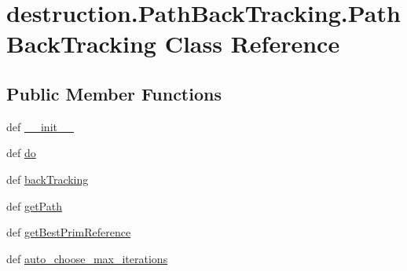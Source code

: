 \hypertarget{classdestruction_1_1_path_back_tracking_1_1_path_back_tracking}{\section{destruction.\-Path\-Back\-Tracking.\-Path\-Back\-Tracking Class Reference}
\label{classdestruction_1_1_path_back_tracking_1_1_path_back_tracking}
}
\subsection*{Public Member Functions}
\begin{DoxyCompactItemize}
\item 
def \hyperlink{classdestruction_1_1_path_back_tracking_1_1_path_back_tracking_a6a529e0fdc65f04fba9c32e741b23523}{\-\_\-\-\_\-init\-\_\-\-\_\-}
\item 
def \hyperlink{classdestruction_1_1_path_back_tracking_1_1_path_back_tracking_a6fe4107ce07cfa378456a085ae2a81dc}{do}
\item 
def \hyperlink{classdestruction_1_1_path_back_tracking_1_1_path_back_tracking_a51b6044cd5c61cda41767c221132fa18}{back\-Tracking}
\item 
def \hyperlink{classdestruction_1_1_path_back_tracking_1_1_path_back_tracking_a5bc1fd380dbb070a6bb532fa628232e4}{get\-Path}
\item 
def \hyperlink{classdestruction_1_1_path_back_tracking_1_1_path_back_tracking_abccd32af1d2aa5aafb07958acb069e12}{get\-Best\-Prim\-Reference}
\item 
def \hyperlink{classdestruction_1_1_path_back_tracking_1_1_path_back_tracking_ac344f9984c22ea6a447ef1871e7bb880}{auto\-\_\-choose\-\_\-max\-\_\-iterations}
\end{DoxyCompactItemize}
